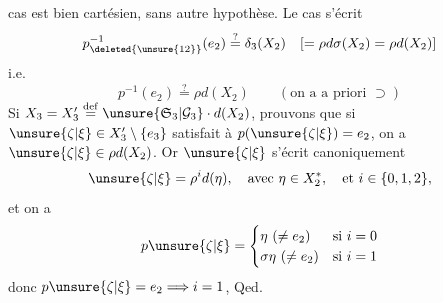  cas est bien cartésien, sans autre hypothèse. Le cas \unsure{$(**)$} s'écrit
\[
p_{\deleted{\unsure{12}}}^{-1}(e_2)\overset{?}=\delta_3(X_2)\quad[=\rho d\sigma(X_2)=\rho d(X_2)]
\]
 i.e.
\[
p^{-1}(e_2)\overset{?}=\rho d(X_2)\qquad(\text{on a a priori }\supset)
\]
Si $X_3=X'_3\overset{\mathrm{def}}=\unsure{\mathfrak S_3|\mathcal G_3}\cdot d(X_2)$,
 prouvons que  si $\unsure{\zeta|\xi}\in X'_3\setminus\{e_3\}$ satisfait à $p(\unsure{\zeta|\xi})=e_2$, on a $\unsure{\zeta|\xi}\in\rho d(X_2)$. Or $\unsure{\zeta|\xi}$ s'écrit canoniquement
\[
\unsure{\zeta|\xi}=\rho^i d(\eta),\quad\text{avec }\eta\in X_2^*,\quad\text{et }i\in\{0,1,2\},
\]
et on a
\[
p\unsure{\zeta|\xi}=\begin{cases}
\eta\ (\ne e_2)&\text{si }i=0\\
\sigma\eta\ (\ne e_2)&\text{si }i=1
\end{cases}
\]
donc $p\unsure{\zeta|\xi}=e_2\Longrightarrow i=1$, Qed.


